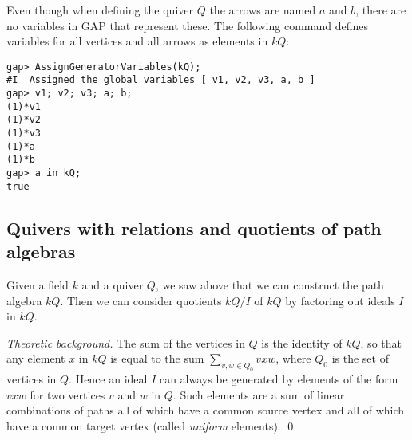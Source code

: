 \documentclass{amsart}
\theoremstyle{definition}
\theoremstyle{theoretic}
\newenvironment{theoback}
{\medskip\small\textit{Theoretic background.} }
{\qed\par\medskip}
\begin{document}
Even though when defining the quiver $Q$ the arrows are named $a$ and
$b$, there are no variables in GAP that represent these.  The
following command defines variables for all vertices and all
arrows as elements in $kQ$:
\begin{verbatim}
gap> AssignGeneratorVariables(kQ);
#I  Assigned the global variables [ v1, v2, v3, a, b ]
gap> v1; v2; v3; a; b;
(1)*v1
(1)*v2
(1)*v3
(1)*a
(1)*b
gap> a in kQ;
true
\end{verbatim}

\subsection{Quivers with relations and quotients of path algebras}

Given a field $k$ and a quiver $Q$, we saw above that we can construct
the path algebra $kQ$.  Then we can consider quotients $kQ/I$ of $kQ$
by factoring out ideals $I$ in $kQ$.  


\begin{theoback} The sum of the vertices in $Q$
is the identity of $kQ$, so that any element $x$ in $kQ$ is equal to
the sum $\sum_{v,w\in Q_0} vxw$, where $Q_0$ is the set of vertices in
$Q$.  Hence an ideal $I$ can always be generated by elements of the
form $vxw$ for two vertices $v$ and $w$ in $Q$.  Such elements are a
sum of linear combinations of paths all of which have a common source
vertex and all of which have a common target vertex (called
\emph{uniform} elements).
\end{theoback}
\end{document}
